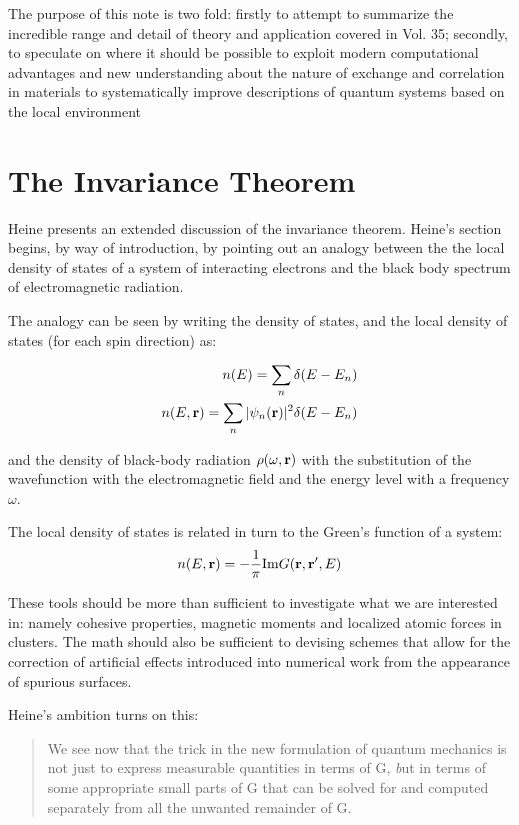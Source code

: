 \documentclass{article}
\def\r{{\bf r}}
\begin{document}
The purpose of this note is two fold: firstly to attempt to summarize the incredible range and
detail of theory and application covered in Vol. 35; secondly, to speculate on where it should be possible
to exploit modern computational advantages and new understanding about the nature of exchange 
and correlation in materials to systematically improve descriptions of quantum systems based
on the local environment 


\section{The Invariance Theorem}
\label{sec:invariance}
Heine presents an extended discussion of the invariance
theorem. Heine's section begins, by way of introduction, by pointing 
out an analogy between  the the local density of states of a system of interacting
electrons and the black body spectrum of electromagnetic radiation.

The analogy can be seen by writing the density of states,
and the local density of states (for each spin direction) as:

\begin{eqnarray}
n(E) = \sum_{n}\delta(E-E_{n}) \\
n(E,\r) = \sum_{n} |\psi_{n}(\r)|^{2}\delta(E-E_{n})
\end{eqnarray}

and the density of black-body radiation $\rho(\omega,\r)$
with the substitution of the wavefunction with the electromagnetic
field and the energy level with a frequency $\omega$.

The local density of states is related in turn to the 
Green's function of a system:
\begin{equation}
n(E,\r) = -\frac{1}{\pi}{\rm Im} G(\r,\r',E)
\end{equation}

These tools should be more than sufficient to investigate what
we are interested in: namely cohesive properties, magnetic moments
and localized atomic forces in clusters. The math
should also be sufficient to devising schemes that allow for the correction
of artificial effects introduced into numerical work from the appearance
of spurious surfaces.

Heine's ambition turns on this:
\begin{quote}
We see now that the trick in the new formulation of quantum 
mechanics is not just to express measurable quantities in terms of 
G, {\emph but in terms of some appropriate small parts of G that can be solved 
for and computed separately from all the unwanted remainder of G.}
\end{quote}
\end{document}
